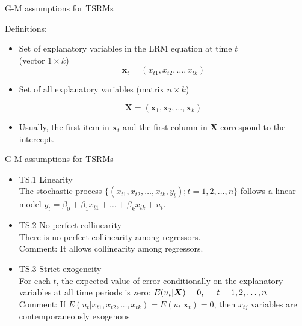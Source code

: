 \documentclass{beamer}
\begin{document}
\begin{frame}{G-M assumptions for TSRMs}

Definitions:
	\begin{itemize}
	\item Set of explanatory variables in the LRM equation at time $t$ \\ 
    (vector $ 1 \times k$)
    $$\boldsymbol{x}_t=(x_{t1},x_{t2}, \dots, x_{tk})$$
    
    \item Set of all explanatory variables (matrix $n \times k$) 
    
    $$\boldsymbol{X}=(\boldsymbol{x}_{1},
    \boldsymbol{x}_{2},\dots,
    \boldsymbol{x}_{k})$$
	    
    \item Usually, the first item in $\boldsymbol{x}_t$ and the first column in $\boldsymbol{X}$ correspond to the intercept.
    \end{itemize}

\end{frame}


\begin{frame}{G-M assumptions for TSRMs}
\begin{itemize}
\item TS.1 Linearity \\ 
The stochastic process $\{(x_{t1},x_{t2},\dots,x_{tk},y_t);t=1,2,\dots, n \}$ 
follows a linear model $ y_t = \beta_0 + \beta_1 x_{t1} + \dots + \beta_k x_{tk}+u_t$.
\vspace{0.5cm}
\item TS.2 No perfect collinearity \\
There is no perfect collinearity among regressors. \\
{\footnotesize Comment: It allows collinearity among regressors.}
\vspace{0.5cm}
\item TS.3 Strict exogeneity \\ 
For each $t$, the expected value of error conditionally on the explanatory variables at all time periods is zero: $ E(u_t|\boldsymbol{X})=0, \hspace{0.5cm} t = 1,2,\dots,n$ \\
    {\footnotesize Comment: If $E(u_t|x_{t1},x_{t2},\dots,x_{tk})=E(u_t|\boldsymbol{x}_t)=0$, then $x_{tj}$ variables are contemporaneously exogenous}  
\end{itemize}
\end{frame}
\end{document}
